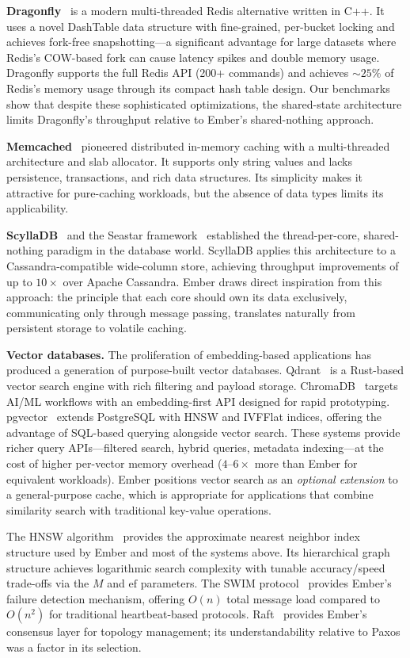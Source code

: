 \documentclass[conference]{IEEEtran}
\begin{document}
\textbf{Dragonfly}~\cite{dragonfly} is a modern multi-threaded Redis
alternative written in C++. It uses a novel DashTable data structure
with fine-grained, per-bucket locking and achieves fork-free
snapshotting---a significant advantage for large datasets where Redis's
COW-based fork can cause latency spikes and double memory usage.
Dragonfly supports the full Redis API (200+ commands) and achieves
${\sim}25\%$ of Redis's memory usage through its compact hash table
design. Our benchmarks show that despite these sophisticated
optimizations, the shared-state architecture limits Dragonfly's
throughput relative to Ember's shared-nothing approach.

\textbf{Memcached}~\cite{memcached} pioneered distributed in-memory
caching with a multi-threaded architecture and slab allocator. It
supports only string values and lacks persistence, transactions, and
rich data structures. Its simplicity makes it attractive for
pure-caching workloads, but the absence of data types limits its
applicability.

\textbf{ScyllaDB}~\cite{scylladb} and the Seastar
framework~\cite{seastar} established the thread-per-core,
shared-nothing paradigm in the database world. ScyllaDB applies this
architecture to a Cassandra-compatible wide-column store, achieving
throughput improvements of up to $10\times$ over Apache Cassandra.
Ember draws direct inspiration from this approach: the principle that
each core should own its data exclusively, communicating only through
message passing, translates naturally from persistent storage to
volatile caching.

\textbf{Vector databases.} The proliferation of embedding-based
applications has produced a generation of purpose-built vector
databases. Qdrant~\cite{qdrant} is a Rust-based vector search engine
with rich filtering and payload storage. ChromaDB~\cite{chromadb}
targets AI/ML workflows with an embedding-first API designed for
rapid prototyping. pgvector~\cite{pgvector} extends PostgreSQL with
HNSW and IVFFlat indices, offering the advantage of SQL-based
querying alongside vector search. These systems provide richer query
APIs---filtered search, hybrid queries, metadata indexing---at the
cost of higher per-vector memory overhead ($4$--$6\times$ more than
Ember for equivalent workloads). Ember positions vector search as an
\emph{optional extension} to a general-purpose cache, which is
appropriate for applications that combine similarity search with
traditional key-value operations.

The HNSW algorithm~\cite{hnsw} provides the approximate nearest
neighbor index structure used by Ember and most of the systems
above. Its hierarchical graph structure achieves logarithmic search
complexity with tunable accuracy/speed trade-offs via the $M$ and
$\text{ef}$ parameters. The SWIM protocol~\cite{swim} provides
Ember's failure detection mechanism, offering $O(n)$ total message
load compared to $O(n^2)$ for traditional heartbeat-based protocols.
Raft~\cite{raft} provides Ember's consensus layer for topology
management; its understandability relative to Paxos was a factor in
its selection.
\end{document}
